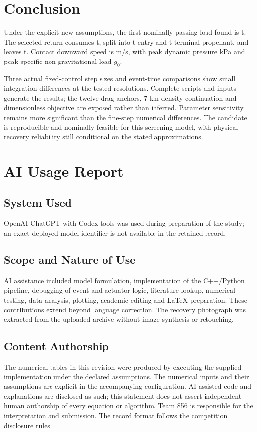 \documentclass[11pt,a4paper]{article}
\begin{document}
\section{Conclusion}
Under the explicit new assumptions, the first nominally passing load found is \RLoad{} t. The selected return consumes \RUsed{} t, split into \REntryFuel{} t entry and \RTerminalFuel{} t terminal propellant, and leaves \RReserve{} t. Contact downward speed is \RWf{} m/s, with peak dynamic pressure \RQmax{} kPa and peak specific non-gravitational load \RNmax{} $g_0$.

Three actual fixed-control step sizes and event-time comparisons show small integration differences at the tested resolutions. Complete scripts and inputs generate the results; the twelve drag anchors, 7 km density continuation and dimensionless objective are exposed rather than inferred. Parameter sensitivity remains more significant than the fine-step numerical differences. The candidate is reproducible and nominally feasible for this screening model, with physical recovery reliability still conditional on the stated approximations.

\section{AI Usage Report}
\subsection{System Used}
OpenAI ChatGPT with Codex tools was used during preparation of the study; an exact deployed model identifier is not available in the retained record.
\subsection{Scope and Nature of Use}
AI assistance included model formulation, implementation of the C++/Python pipeline, debugging of event and actuator logic, literature lookup, numerical testing, data analysis, plotting, academic editing and LaTeX preparation. These contributions extend beyond language correction. The recovery photograph was extracted from the uploaded archive without image synthesis or retouching.
\subsection{Content Authorship}
The numerical tables in this revision were produced by executing the supplied implementation under the declared assumptions. The numerical inputs and their assumptions are explicit in the accompanying configuration. AI-assisted code and explanations are disclosed as such; this statement does not assert independent human authorship of every equation or algorithm. Team 856 is responsible for the interpretation and submission. The record format follows the competition disclosure rules \cite{rules}.
\end{document}
